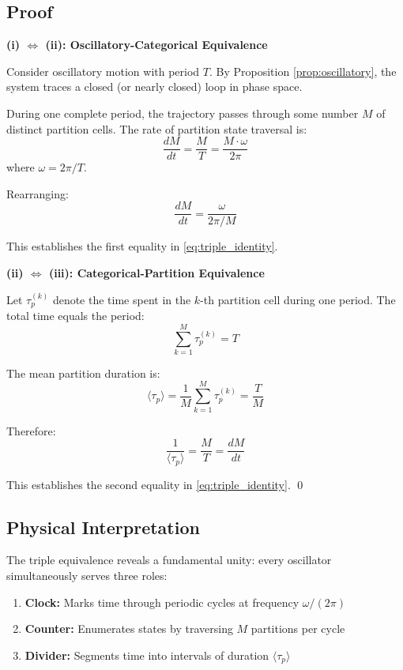 \documentclass[twocolumn,10pt,twoside]{article}
\begin{document}
\subsection{Proof}

\textbf{(i) $\Leftrightarrow$ (ii): Oscillatory-Categorical Equivalence}

Consider oscillatory motion with period $T$. By Proposition \ref{prop:oscillatory}, the system traces a closed (or nearly closed) loop in phase space.

During one complete period, the trajectory passes through some number $M$ of distinct partition cells. The rate of partition state traversal is:
\begin{equation}
\frac{dM}{dt} = \frac{M}{T} = \frac{M \cdot \omega}{2\pi}
\end{equation}
where $\omega = 2\pi/T$.

Rearranging:
\begin{equation}
\frac{dM}{dt} = \frac{\omega}{2\pi/M}
\end{equation}

This establishes the first equality in \eqref{eq:triple_identity}.

\textbf{(ii) $\Leftrightarrow$ (iii): Categorical-Partition Equivalence}

Let $\tau_p^{(k)}$ denote the time spent in the $k$-th partition cell during one period. The total time equals the period:
\begin{equation}
\sum_{k=1}^{M} \tau_p^{(k)} = T
\end{equation}

The mean partition duration is:
\begin{equation}
\langle\tau_p\rangle = \frac{1}{M} \sum_{k=1}^{M} \tau_p^{(k)} = \frac{T}{M}
\end{equation}

Therefore:
\begin{equation}
\frac{1}{\langle\tau_p\rangle} = \frac{M}{T} = \frac{dM}{dt}
\end{equation}

This establishes the second equality in \eqref{eq:triple_identity}. \qed

\subsection{Physical Interpretation}

The triple equivalence reveals a fundamental unity: every oscillator simultaneously serves three roles:
\begin{enumerate}
    \item \textbf{Clock:} Marks time through periodic cycles at frequency $\omega/(2\pi)$
    \item \textbf{Counter:} Enumerates states by traversing $M$ partitions per cycle
    \item \textbf{Divider:} Segments time into intervals of duration $\langle\tau_p\rangle$
\end{enumerate}
\end{document}
